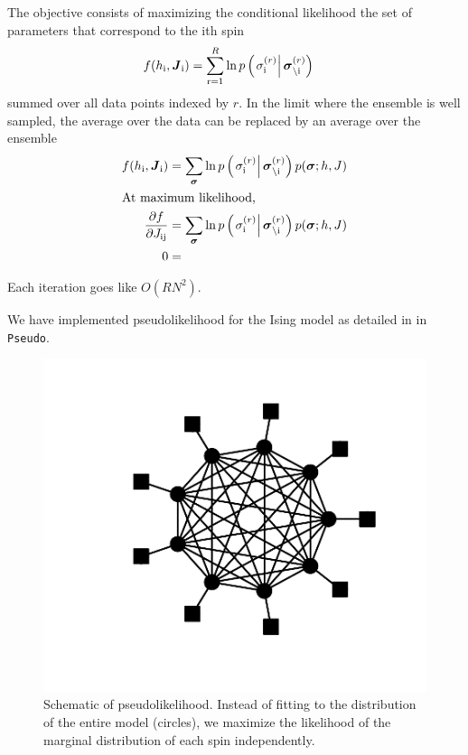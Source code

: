 \documentclass[aps,prl,twocolumn]{revtex4-1}
\begin{document}
The objective consists of maximizing the conditional likelihood the set of parameters that correspond to the ith spin
\begin{align}
	f(h_{\rm i},\boldsymbol{J}_{\rm i}) &= \sum_{\rm r=1}^R \ln p\left(\left.\sigma_{\rm i}^{(r)}\right|\boldsymbol{\sigma}_{\backslash\rm i}^{(r)}\right)
\end{align}
summed over all data points indexed by $r$.
In the limit where the ensemble is well sampled, the average over the data can be replaced by an average over the ensemble
\begin{align}
	f(h_{\rm i},\boldsymbol{J}_{\rm i}) &= \sum_{\boldsymbol{\sigma}} \ln p\left(\left.\sigma_{\rm i}^{(r)}\right|\boldsymbol{\sigma}_{\backslash\rm i}^{(r)}\right)p(\boldsymbol{\sigma};h,J)\\
\intertext{At maximum likelihood,}
	\frac{\partial f}{\partial J_{\rm ij}} &= \sum_{\boldsymbol{\sigma}} \ln p\left(\left.\sigma_{\rm i}^{(r)}\right|\boldsymbol{\sigma}_{\backslash\rm i}^{(r)}\right)p(\boldsymbol{\sigma};h,J)\\
	0 &=
\end{align}

Each iteration goes like $O(RN^2)$.

We have implemented pseudolikelihood for the Ising model as detailed in \cite{Aurell:2012hi} in {\tt Pseudo}.

\begin{figure}[htbp]\centering
	\includegraphics[width=.85\linewidth,clip,trim={100 50 30 30}]{images/pseudo}
\caption{Schematic of pseudolikelihood. Instead of fitting to the distribution of the entire model (circles), we maximize the likelihood of the marginal distribution of each spin independently.}
\label{default}
\end{figure}
\end{document}
